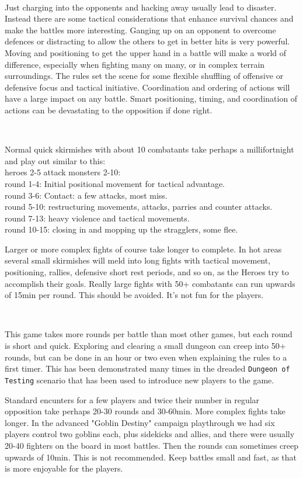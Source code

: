 \

Just charging into the opponents and hacking away usually lead to disaster. Instead there are some tactical considerations that enhance survival chances and make the battles more interesting. Ganging up on an opponent to overcome defences or distracting to allow the others to get in better hits is very powerful. Moving and positioning to get the upper hand in a battle will make a world of difference, especially when fighting many on many, or in complex terrain surroundings. The rules set the scene for some flexible shuffling of offensive or defensive focus and tactical initiative. Coordination and ordering of actions will have a large impact on any battle. Smart positioning, timing, and coordination of actions can be devastating to the opposition if done right.

\

Normal quick skirmishes with about 10 combatants take perhaps a millifortnight and play out similar to this: \\
heroes 2-5 attack monsters 2-10: \\
round 1-4: Initial positional movement for tactical advantage. \\
round 3-6: Contact: a few attacks, most miss. \\
round 5-10: restructuring movements, attacks, parries and counter attacks. \\
round 7-13: heavy violence and tactical movements. \\
round 10-15: closing in and mopping up the stragglers, some flee.

Larger or more complex fights of course take longer to complete. In hot areas several small skirmishes will meld into long fights with tactical movement, positioning, rallies, defensive short rest periods, and so on, as the Heroes try to accomplish their goals.
Really large fights with 50+ combatants can run upwards of 15min per round. This should be avoided. It's not fun for the players.

\

This game takes more rounds per battle than most other games, but each round is short and quick. Exploring and clearing a small dungeon can creep into 50+ rounds, but can be done in an hour or two even when explaining the rules to a first timer. This has been demonstrated many times in the dreaded \texttt{Dungeon of Testing} scenario that has been used to introduce new players to the game.

Standard encunters for a few players and twice their number in regular opposition take perhaps 20-30 rounds and 30-60min. More complex fights take longer. In the advanced "Goblin Destiny" campaign playthrough we had six players control two goblins each, plus sidekicks and allies, and there were usually 20-40 fighters on the board in most battles. Then the rounds can sometimes creep upwards of 10min. This is not recommended. Keep battles small and fast, as that is more enjoyable for the players.

